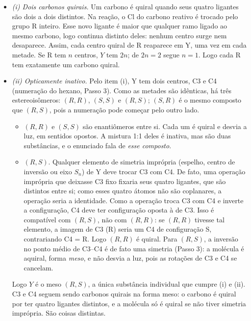 \documentclass{article}%
\begin{document}
\begin{itemize}
\item \emph{(i) Dois carbonos quirais.} Um carbono é quiral quando seus quatro ligantes são dois a dois distintos. Na reação, o Cl do carbono reativo é trocado pelo grupo R inteiro. Esse novo ligante é maior que qualquer ramo ligado ao mesmo carbono, logo continua distinto deles: nenhum centro surge nem desaparece. Assim, cada centro quiral de R reaparece em Y, uma vez em cada metade. Se R tem $n$ centros, $Y$ tem $2n$; de $2n = 2$ segue $n = 1$. Logo cada R tem exatamente um carbono quiral.

\item \emph{(ii) Opticamente inativo.} Pelo item (i), Y tem dois centros, C3 e C4 (numeração do hexano, Passo 3). Como as metades são idênticas, há três estereoisômeros: $(R,R)$, $(S,S)$ e $(R,S)$; $(S,R)$ é o mesmo composto que $(R,S)$, pois a numeração pode começar pelo outro lado.
\begin{itemize}
\item $(R,R)$ e $(S,S)$ são enantiômeros entre si. Cada um é quiral e desvia a luz, em sentidos opostos. A mistura 1:1 deles é inativa, mas são duas substâncias, e o enunciado fala de \emph{esse composto}.
\item $(R,S)$. Qualquer elemento de simetria imprópria (espelho, centro de inversão ou eixo $S_n$) de Y deve trocar C3 com C4. De fato, uma operação imprópria que deixasse C3 fixo fixaria seus quatro ligantes, que são distintos entre si; como esses quatro átomos não são coplanares, a operação seria a identidade. Como a operação troca C3 com C4 e inverte a configuração, C4 deve ter configuração oposta à de C3. Isso é compatível com $(R,S)$, não com $(R,R)$: se $(R,R)$ tivesse tal elemento, a imagem de C3 (R) seria um C4 de configuração S, contrariando C4 = R. Logo $(R,R)$ é quiral. Para $(R,S)$, a inversão no ponto médio de C3--C4 é de fato uma simetria (Passo 3): a molécula é aquiral, forma \emph{meso}, e não desvia a luz, pois as rotações de C3 e C4 se cancelam.
\end{itemize}
Logo $Y$ é o meso $(R,S)$, a única substância individual que cumpre (i) e (ii). C3 e C4 seguem sendo carbonos quirais na forma meso: o carbono é quiral por ter quatro ligantes distintos, e a molécula só é quiral se não tiver simetria imprópria. São coisas distintas.


\end{itemize}
\end{document}

